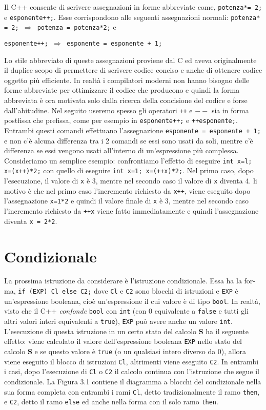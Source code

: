 \documentclass[a4paper,12pt]{book}
\begin{document}
Il C++ consente di scrivere assegnazioni in forme abbreviate come, \texttt{potenza*= 2;} e \texttt{esponente++;}. Esse corrispondono alle seguenti assegnazioni normali: \texttt{potenza* = 2; $\Rightarrow{}$ potenza = potenza*2;} e 

\noindent \texttt{esponente++; $\Rightarrow{}$ esponente = esponente + 1;}

\noindent Lo stile abbreviato di queste assegnazioni proviene dal C ed aveva originalmente il duplice scopo di permettere di scrivere codice conciso e anche di ottenere codice oggetto più efficiente. In realtà i compilatori moderni non hanno bisogno delle forme abbreviate per ottimizzare il codice che producono e quindi la forma abbreviata è ora motivata solo dalla ricerca della concisione del codice e forse dall'abitudine. Nel seguito useremo spesso gli operatori \texttt{++} e \texttt{$--$} sia in forma postfissa che prefissa, come per esempio in \texttt{esponente++;} e \texttt{++esponente;}. Entrambi questi comandi effettuano l'assegnazione \texttt{esponente = esponente + 1;} e non c'è alcuna differenza tra i 2 comandi se essi sono usati da soli, mentre c'è differenza se essi vengono usati all'interno di un'espressione più complessa. Consideriamo un semplice esempio: confrontiamo l'effetto di eseguire \texttt{int x=l; x=(x++)*2;} con quello di eseguire \texttt{int x=1; x=(++x)*2;}. Nel primo caso, dopo l'esecuzione, il valore di \texttt{x} è 3, mentre nel secondo caso il valore di \texttt{x} diventa 4. li motivo è che nel primo caso l'incremento richiesto da \texttt{x++}, viene eseguito dopo l'assegnazione \texttt{x=1*2} e quindi il valore finale di \texttt{x} è 3, mentre nel secondo caso l'incremento richiesto da \texttt{++x} viene fatto immediatamente e quindi l'assegnazione diventa \texttt{x = 2*2}.

\section{Condizionale}
La prossima istruzione da considerare è l'istruzione condizionale. Essa ha la for­ma, \texttt{if (EXP) Cl else C2;} dove \texttt{Cl} e \texttt{C2} sono blocchi di istruzioni e \texttt{EXP} è un'espressione booleana, cioè un'espressione il cui valore è di tipo \texttt{bool}. In realtà, visto che il C++ \textit{confonde} \texttt{bool} con \texttt{int} (con 0 equivalente a \texttt{false} e tutti gli altri valori interi equivalenti a \texttt{true}), \texttt{EXP} può avere anche un valore \texttt{int}. L'esecuzione di questa istruzione in un certo stato del calcolo \textbf{S} ha il seguente effetto: viene calcolato il valore dell'espressione booleana \texttt{EXP} nello stato del calcolo \textbf{S} e se questo valore è \texttt{true} (o un qualsiasi intero diverso da 0), allora viene eseguito il blocco di istruzioni \texttt{Cl}, altrimenti viene eseguito \texttt{C2}. In entrambi i casi, dopo l'esecuzione di \texttt{Cl} o \texttt{C2} il calcolo continua con l'istruzione che segue il condizionale. La Figura 3.1 contiene il diagramma a blocchi del condizionale nella sua forma completa con entrambi i rami \texttt{Cl}, detto tradizionalmente il ramo \texttt{then}, e \texttt{C2}, detto il ramo \texttt{else} ed anche nella forma con il solo ramo \texttt{then}. 
\end{document}
